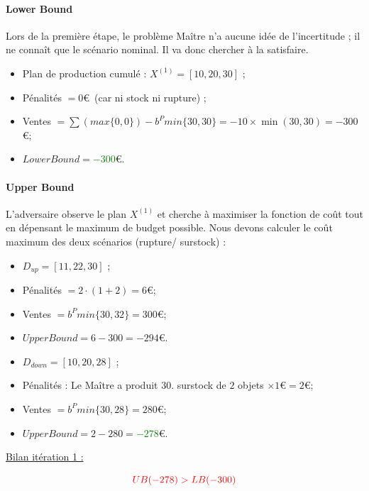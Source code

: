 \paragraph{Lower Bound} Lors de la première étape, le problème Maître n'a aucune idée de l'incertitude ; il ne connaît que le scénario nominal. Il va donc chercher à la satisfaire.

\begin{itemize}
    \item Plan de production cumulé : $X^{(1)}=[10, 20, 30]$ ;
    \item Pénalités $=0$\euro\, (car ni stock ni rupture) ;
    \item Ventes $=\sum (max\{0, 0\}) - b^Pmin\{30, 30\}=- 10\times \min(30, 30)=-300$\euro ;
    \item $LowerBound=$\textcolor{green}{$-300$}\euro.
\end{itemize}

\paragraph{Upper Bound} L'adversaire observe le plan $X^{(1)}$ et cherche à maximiser la fonction de coût tout en dépensant le maximum de budget possible. Nous devons calculer le coût maximum des deux scénarios (rupture/ surstock) :

\begin{itemize}
Scénario 1 : Attaque $D_{up}$ (rupture)
    \item $D_{up}=[11, 22, 30]$ ;
    \item Pénalités $=2\cdot(1+2)=6$\euro ;
    \item Ventes $=b^Pmin\{30, 32\}=300$\euro ;
    \item $UpperBound=6-300=-294$\euro.
\end{itemize}

\begin{itemize}
Scénario 2 : Attaque $D_{down}$ (surstock)
    \item $D_{down}=[10, 20, 28]$ ;
    \item Pénalités : Le Maître a produit $30$. surstock de $2$ objets $\times 1$\euro$=2$\euro ;
    \item Ventes $=b^Pmin\{30, 28\}=280$\euro ;
    \item $UpperBound=2-280=$\textcolor{green}{$-278$}\euro.
\end{itemize}

\underline{Bilan itération 1 :}

\[
    \textcolor{red}{UB(-278) > LB(-300)}
\]

